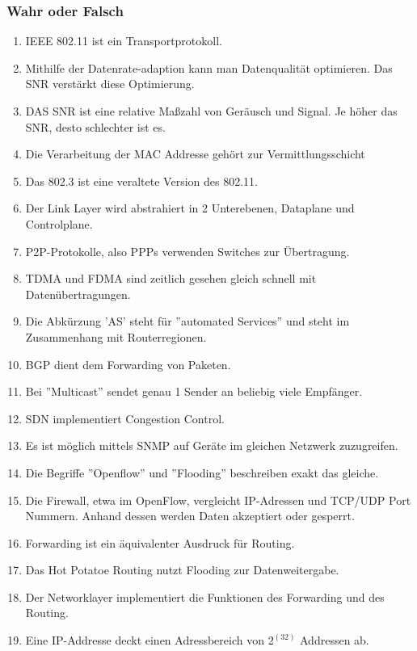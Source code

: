 \documentclass{article}
\begin{document}
    \subsubsection{Wahr oder Falsch}
    \begin{enumerate}
        \item IEEE 802.11 ist ein Transportprotokoll.
        \item Mithilfe der Datenrate-adaption kann man Datenqualität optimieren. Das SNR verstärkt diese Optimierung.
        \item DAS SNR ist eine relative Maßzahl von Geräusch und Signal. Je höher das SNR, desto schlechter ist es.
        \item Die Verarbeitung der MAC Addresse gehört zur Vermittlungsschicht
        \item Das 802.3 ist eine veraltete Version des 802.11.
        \item Der Link Layer wird abstrahiert in 2 Unterebenen, Dataplane und Controlplane.
        \item P2P-Protokolle, also PPPs verwenden Switches zur Übertragung.
        \item TDMA und FDMA sind zeitlich gesehen gleich schnell mit Datenübertragungen.
        \item Die Abkürzung 'AS' steht für ''automated Services'' und steht im Zusammenhang mit Routerregionen.
        \item BGP dient dem Forwarding von Paketen.
        \item Bei ''Multicast'' sendet genau 1 Sender an beliebig viele Empfänger.
        \item SDN implementiert Congestion Control.
        \item Es ist möglich mittels SNMP auf Geräte im gleichen Netzwerk zuzugreifen.
        \item Die Begriffe ''Openflow'' und ''Flooding'' beschreiben exakt das gleiche.
        \item Die Firewall, etwa im OpenFlow, vergleicht IP-Adressen und TCP/UDP Port Nummern. Anhand dessen werden Daten akzeptiert oder gesperrt.
        \item Forwarding ist ein äquivalenter Ausdruck für Routing.
        \item Das Hot Potatoe Routing nutzt Flooding zur Datenweitergabe.
        \item Der Networklayer implementiert die Funktionen des Forwarding und des Routing. 
        \item Eine IP-Addresse deckt einen Adressbereich von $2^(32)$ Addressen ab. 

\end{enumerate}
\end{document}
